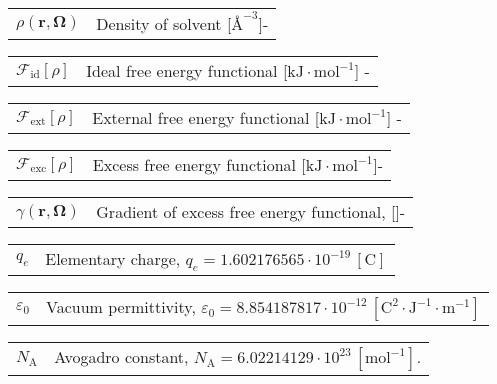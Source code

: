 \hspace{-1.5em}%
\begin{tabular}{>{\raggedright}p{3.3em}l}
$\rho(\mathbf{r},\mathbf{\Omega})$ & Density of solvent {[}$\textrm{\AA}^{-3}${]}-\tabularnewline
\end{tabular}

\hspace{-1.5em}%
\begin{tabular}{>{\raggedright}p{3.3em}l}
$\mathcal{F}_{\mathrm{id}}[\rho]$ & Ideal free energy functional {[}$\mathrm{kJ\cdot mol^{-1}}${]} -\tabularnewline
\end{tabular}

\hspace{-1.5em}%
\begin{tabular}{>{\raggedright}p{3.3em}l}
$\mathcal{F}_{\mathrm{ext}}[\rho]$ & External free energy functional {[}$\mathrm{kJ\cdot mol^{-1}}${]}
-\tabularnewline
\end{tabular}

\hspace{-1.5em}%
\begin{tabular}{>{\raggedright}p{3.3em}l}
$\mathcal{F}_{\mathrm{exc}}[\rho]$ & Excess free energy functional {[}$\mathrm{kJ\cdot mol^{-1}}${]}- \tabularnewline
\end{tabular}

\hspace{-1.5em}%
\begin{tabular}{>{\raggedright}p{3.3em}l}
$\gamma(\mathbf{r},\mathbf{\Omega})$ & Gradient of excess free energy functional, {[}$\mathrm{}${]}-\tabularnewline
\end{tabular}

\hspace{-1.5em}%
\begin{tabular}{>{\raggedright}p{3.3em}l}
$q_{e}$ & Elementary charge, $q_{e}=1.602176565\cdot10^{-19}\,\mathrm{[C]}$\tabularnewline
\end{tabular}

\hspace{-1.5em}%
\begin{tabular}{>{\raggedright}p{3.3em}l}
$\varepsilon_{0}$ & Vacuum permittivity, $\varepsilon_{0}=8.854187817\cdot10^{-12}\,\mathrm{[C^{2}\cdot J^{-1}\cdot m^{-1}]}$\tabularnewline
\end{tabular}

\hspace{-1.5em}%
\begin{tabular}{>{\raggedright}p{3.3em}l}
$N_{\mathrm{A}}$ & Avogadro constant, $N_{\mathrm{A}}=6.02214129\cdot10^{23}\,\mathrm{[mol^{-1}]}$.\tabularnewline
\end{tabular}

